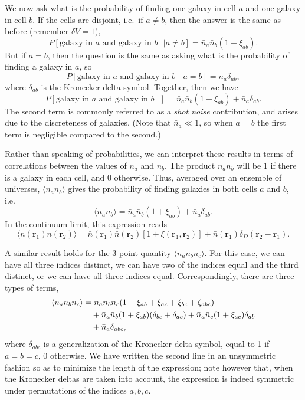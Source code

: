 \documentclass{article}
\newcommand{\nbar}{\bar{n}}
\renewcommand{\vec}[1]{\bm{#1}}
\renewcommand{\r}{\vec{r}}
\begin{document}
We now ask what is the probability of finding one galaxy in cell $a$ and one
galaxy in cell $b$.  If the cells are disjoint, i.e.~if $a \ne b$, then the
answer is the same as before (remember $\delta V = 1$),
\begin{equation}
    P[\text{galaxy in $a$ and galaxy in $b$ } | a \ne b] = \nbar_a \nbar_b (1 + \xi_{ab}).
\end{equation}
But if $a = b$, then the question is the same as asking what is the probability
of finding a galaxy in $a$, so
\begin{equation}
    P[\text{galaxy in $a$ and galaxy in $b$ } | a = b] = \nbar_a \delta_{ab},
\end{equation}
where $\delta_{ab}$ is the Kronecker delta symbol.  Together, then we have
\begin{equation}
    P[\text{galaxy in $a$ and galaxy in $b$ }] = \nbar_a \nbar_b (1 + \xi_{ab}) + \nbar_a \delta_{ab}.
\end{equation}
The second term is commonly referred to as a \emph{shot noise} contribution,
and arises due to the discreteness of galaxies.  (Note that $\nbar_a \ll 1$,
so when $a = b$ the first term is negligible compared to the second.)

Rather than speaking of probabilities, we can interpret these results in terms
of correlations between the values of $n_a$ and $n_b$.  The product $n_a n_b$
will be 1 if there is a galaxy in each cell, and 0 otherwise.  Thus, averaged
over an ensemble of universes, $\langle n_a n_b \rangle$ gives the probability
of finding galaxies in both cells $a$ and $b$, i.e.
\begin{equation}
    \langle n_a n_b \rangle = \nbar_a \nbar_b (1 + \xi_{ab}) + \nbar_a \delta_{ab}.
\end{equation}
In the continuum limit, this expression reads
\begin{equation}
    \langle n(\r_1) n(\r_2) \rangle = \nbar(\r_1) \nbar(\r_2) [1 + \xi(\r_1,\r_2)] + \nbar(\r_1) \delta_D(\r_2-\r_1).
\end{equation}

A similar result holds for the 3-point quantity $\langle n_a n_b n_c \rangle$.
For this case, we can have all three indices distinct, we can have two of the
indices equal and the third distinct, or we can have all three indices equal.
Correspondingly, there are three types of terms,
\begin{align}
    \langle n_a n_b n_c \rangle
        &= \nbar_a \nbar_b \nbar_c (1 + \xi_{ab} + \xi_{ac} + \xi_{bc} + \zeta_{abc}) \notag \\
        &\quad + \nbar_a \nbar_b (1 + \xi_{ab}) (\delta_{bc} + \delta_{ac}) + \nbar_a \nbar_c (1 + \xi_{ac}) \delta_{ab} \notag \\
        &\quad + \nbar_a \delta_{abc},
\end{align}
where $\delta_{abc}$ is a generalization of the Kronecker delta symbol, equal
to 1 if $a = b = c$, 0 otherwise.  We have written the second line in an
unsymmetric fashion so as to minimize the length of the expression; note
however that, when the Kronecker deltas are taken into account, the expression
is indeed symmetric under permutations of the indices $a,b,c$.
\end{document}

